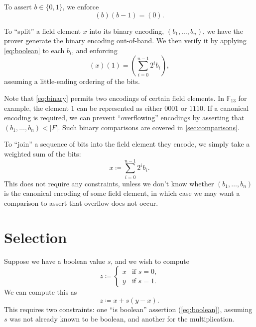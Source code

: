 \documentclass{article}
\begin{document}
To assert $b \in \{ 0, 1 \}$, we enforce
\begin{equation} \label{eq:boolean}
  (b) (b - 1) = (0).
\end{equation}

To ``split'' a field element $x$ into its binary encoding, $(b_1, \dots, b_n)$, we have the prover generate the binary encoding out-of-band. We then verify it by applying \autoref{eq:boolean} to each $b_i$, and enforcing
\begin{equation} \label{eq:binary}
  (x) (1) = \left( \sum_{i=0}^{n-1} 2^i b_i \right),
\end{equation}
assuming a little-ending ordering of the bits.

Note that \autoref{eq:binary} permits two encodings of certain field elements. In $\mathbb{F}_{13}$ for example, the element $1$ can be represented as either $0001$ or $1110$. If a canonical encoding is required, we can prevent ``overflowing'' encodings by asserting that $(b_1, \dots, b_n) < |F|$. Such binary comparisons are covered in \autoref{sec:comparisons}.

To ``join'' a sequence of bits into the field element they encode, we simply take a weighted sum of the bits:
\begin{equation} \label{eq:join}
  x \coloneqq \sum_{i=0}^{n-1} 2^i b_i.
\end{equation}
This does not require any constraints, unless we don't know whether $(b_1, \dots, b_n)$ is the canonical encoding of some field element, in which case we may want a comparison to assert that overflow does not occur.


\section{Selection} \label{sec:selection}

Suppose we have a boolean value $s$, and we wish to compute
\begin{equation}
  z \coloneqq
  \begin{cases}
    x & \text{if $s = 0$,} \\
    y & \text{if $s = 1$.}
  \end{cases}
\end{equation}
We can compute this as
\begin{equation} \label{eq:selection}
  z \coloneqq x + s(y - x).
\end{equation}
This requires two constraints: one ``is boolean'' assertion (\autoref{eq:boolean}), assuming $s$ was not already known to be boolean, and another for the multiplication.
\end{document}
